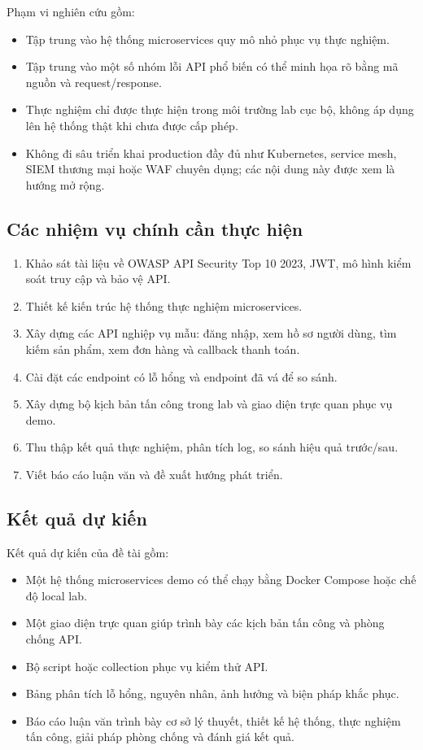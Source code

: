 \documentclass[14pt,a4paper]{extarticle}
\begin{document}
Phạm vi nghiên cứu gồm:
\begin{itemize}
  \item Tập trung vào hệ thống microservices quy mô nhỏ phục vụ thực nghiệm.
  \item Tập trung vào một số nhóm lỗi API phổ biến có thể minh họa rõ bằng mã nguồn và request/response.
  \item Thực nghiệm chỉ được thực hiện trong môi trường lab cục bộ, không áp dụng lên hệ thống thật khi chưa được cấp phép.
  \item Không đi sâu triển khai production đầy đủ như Kubernetes, service mesh, SIEM thương mại hoặc WAF chuyên dụng; các nội dung này được xem là hướng mở rộng.
\end{itemize}

\subsection{Các nhiệm vụ chính cần thực hiện}
\begin{enumerate}
  \item Khảo sát tài liệu về OWASP API Security Top 10 2023, JWT, mô hình kiểm soát truy cập và bảo vệ API.
  \item Thiết kế kiến trúc hệ thống thực nghiệm microservices.
  \item Xây dựng các API nghiệp vụ mẫu: đăng nhập, xem hồ sơ người dùng, tìm kiếm sản phẩm, xem đơn hàng và callback thanh toán.
  \item Cài đặt các endpoint có lỗ hổng và endpoint đã vá để so sánh.
  \item Xây dựng bộ kịch bản tấn công trong lab và giao diện trực quan phục vụ demo.
  \item Thu thập kết quả thực nghiệm, phân tích log, so sánh hiệu quả trước/sau.
  \item Viết báo cáo luận văn và đề xuất hướng phát triển.
\end{enumerate}

\subsection{Kết quả dự kiến}
Kết quả dự kiến của đề tài gồm:
\begin{itemize}
  \item Một hệ thống microservices demo có thể chạy bằng Docker Compose hoặc chế độ local lab.
  \item Một giao diện trực quan giúp trình bày các kịch bản tấn công và phòng chống API.
  \item Bộ script hoặc collection phục vụ kiểm thử API.
  \item Bảng phân tích lỗ hổng, nguyên nhân, ảnh hưởng và biện pháp khắc phục.
  \item Báo cáo luận văn trình bày cơ sở lý thuyết, thiết kế hệ thống, thực nghiệm tấn công, giải pháp phòng chống và đánh giá kết quả.
\end{itemize}
\end{document}
